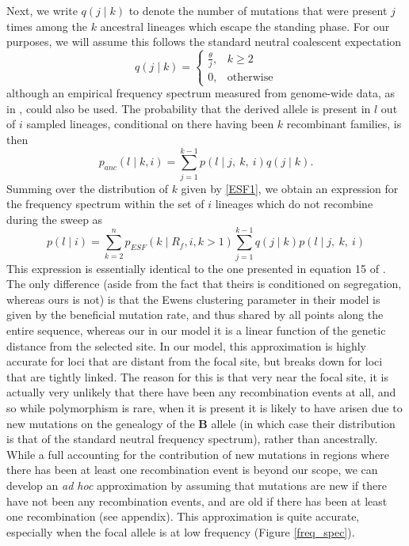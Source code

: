 \documentclass[a4paper,10pt]{article}
\begin{document}
Next, we write $q\left(j \mid k\right)$ to denote the number of mutations that were present $j$ times among the $k$ ancestral lineages which escape the standing phase. For our purposes, we will assume this follows the standard neutral coalescent expectation 
\begin{equation}
	q(j \mid k) = 	\begin{cases}
					\frac{\theta}{j}, 	& k \geq 2 \\
					0,			& \text{otherwise}
				\end{cases}
\end{equation}
although an empirical frequency spectrum measured from genome-wide data, as in \cite{Nielsen:2005bla}, could also be used. The probability that the derived allele is present in $l$ out of $i$ sampled lineages, conditional on there having been $k$ recombinant families, is then 
\begin{equation}
	p_{anc}(l \mid k, i ) = \sum_{j=1}^{k-1} p(l \mid j,~k, ~i)q(j\mid k).
\end{equation}	
Summing over the distribution of $k$ given by \eqref{ESF1}, we obtain an expression for the frequency spectrum within the set of $i$ lineages which do not recombine during the sweep as
\begin{equation}
	p(l \mid i) =  \sum_{k=2}^{n}  p_{ESF}(k \mid R_f,i,k>1)  \sum_{j=1}^{k-1} q(j\mid k) p(l \mid j,~k, ~i) \label{no-sweep-rec-freq-spec}
\end{equation}
This expression is essentially identical to the one presented in equation 15 of \cite{Pennings2006}. The only difference (aside from the fact that theirs is conditioned on segregation, whereas ours is not) is that the Ewens clustering parameter in their model is given by the beneficial mutation rate, and thus shared by all points along the entire sequence, whereas our in our model it is a linear function of the genetic distance from the selected site. In our model, this approximation is highly accurate for loci that are distant from the focal site, but breaks down for loci that are tightly linked. The reason for this is that very near the focal site, it is actually very unlikely that there have been any recombination events at all, and so while polymorphism is rare, when it is present it is likely to have arisen due to new mutations on the genealogy of the $\textbf{B}$ allele (in which case their distribution is that of the standard neutral frequency spectrum), rather than ancestrally. While a full accounting for the contribution of new mutations in regions where there has been at least one recombination event is beyond our scope, we can develop an \textit{ad hoc} approximation by assuming that mutations are new if there have not been any recombination events, and are old if there has been at least one recombination (see appendix). This approximation is quite accurate, especially when the focal allele is at low frequency (Figure \ref{freq_spec}).
\end{document}
